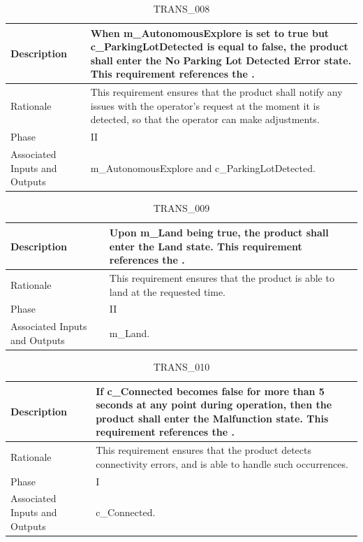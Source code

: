 \documentclass{article}
\begin{document}
\begin{table}[!h]
\begin{center}
\caption {TRANS\_008} 
\label{TRANS_008}
\begin{tabular}{ | m{3cm} | m{11cm} | }
\hline
Description & When m\_AutonomousExplore is set to true but c\_ParkingLotDetected is equal to false, the product shall enter the No Parking Lot Detected Error state. This requirement references the \nameref{No Parking Lot Detected Error State}. \\
\hline
Rationale & This requirement ensures that the product shall notify any issues with the operator's request at the moment it is detected, so that the operator can make adjustments. \\
\hline
Phase & II \\
\hline
Associated Inputs and Outputs & m\_AutonomousExplore and c\_ParkingLotDetected. \\
\hline
\end{tabular}
\end{center}
\end{table}

\begin{table}[!h]
\begin{center}
\caption {TRANS\_009} 
\label{TRANS_009}
\begin{tabular}{ | m{3cm} | m{11cm} | }
\hline
Description & Upon m\_Land being true, the product shall enter the Land state. This requirement references the \nameref{Land State}. \\
\hline
Rationale & This requirement ensures that the product is able to land at the requested time. \\
\hline
Phase & II \\
\hline
Associated Inputs and Outputs & m\_Land. \\
\hline
\end{tabular}
\end{center}
\end{table}

\begin{table}[!h]
\begin{center}
\caption {TRANS\_010} 
\label{TRANS_010}
\begin{tabular}{ | m{3cm} | m{11cm} | }
\hline
Description & If c\_Connected becomes false for more than 5 seconds at any point during operation, then the product shall enter the Malfunction state. This requirement references the \nameref{Malfunction State}. \\
\hline
Rationale & This requirement ensures that the product detects connectivity errors, and is able to handle such occurrences. \\
\hline
Phase & I \\
\hline
Associated Inputs and Outputs & c\_Connected. \\
\hline
\end{tabular}
\end{center}
\end{table}
\end{document}
